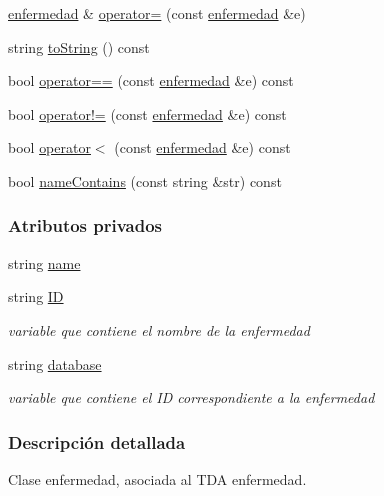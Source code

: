 \begin{DoxyCompactItemize}
\item 
\hyperlink{classenfermedad}{enfermedad} \& \hyperlink{classenfermedad_a795be16b7e3e6a858211ff20a62c9d85}{operator=} (const \hyperlink{classenfermedad}{enfermedad} \&e)
\item 
string \hyperlink{classenfermedad_a044425928b4f7fa6a398cf2486260b23}{to\+String} () const 
\item 
bool \hyperlink{classenfermedad_ac2786ad7be914729516dd15611532fbb}{operator==} (const \hyperlink{classenfermedad}{enfermedad} \&e) const 
\item 
bool \hyperlink{classenfermedad_a85bf5cbb035fd4712ff9a72188060e5c}{operator!=} (const \hyperlink{classenfermedad}{enfermedad} \&e) const 
\item 
bool \hyperlink{classenfermedad_a2b3361849fa17dc88be561cd4233d584}{operator$<$} (const \hyperlink{classenfermedad}{enfermedad} \&e) const 
\item 
bool \hyperlink{classenfermedad_a31f2b1bed5745d9f00f3e567c04e68af}{name\+Contains} (const string \&str) const 
\end{DoxyCompactItemize}
\subsubsection*{Atributos privados}
\begin{DoxyCompactItemize}
\item 
string \hyperlink{classenfermedad_ad7c4204057028a73bde6022678c6813e}{name}
\item 
string \hyperlink{classenfermedad_a689cdbd469ecc28e045bda2f62a229d2}{ID}
\begin{DoxyCompactList}\small\item\em variable que contiene el nombre de la enfermedad \end{DoxyCompactList}\item 
string \hyperlink{classenfermedad_a3684b7ec850d4c9357dd21bdd5e02803}{database}
\begin{DoxyCompactList}\small\item\em variable que contiene el ID correspondiente a la enfermedad \end{DoxyCompactList}\end{DoxyCompactItemize}


\subsubsection{Descripción detallada}
Clase enfermedad, asociada al T\+DA enfermedad. 

